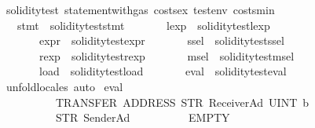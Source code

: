 \begin{isabellebody}
\isanewline
{}\isamarkupfalse%
\ soliditytest{}{\isacharcolon}{\kern0pt}\ statement{\isacharunderscore}{\kern0pt}with{\isacharunderscore}{\kern0pt}gas\ costs{\isacharunderscore}{\kern0pt}ex\ testenv{}\ costs{\isacharunderscore}{\kern0pt}min\isanewline
\ \ \ stmt{}\ {\isacharequal}{\kern0pt}\ {\isachardoublequoteopen}soliditytest{}{\isachardot}{\kern0pt}stmt{\isachardoublequoteclose}\isanewline
\ \ \ \ \ \ \ lexp{}\ {\isacharequal}{\kern0pt}\ soliditytest{}{\isachardot}{\kern0pt}lexp\ \isanewline
\ \ \ \ \ \ \ expr{}\ {\isacharequal}{\kern0pt}\ soliditytest{}{\isachardot}{\kern0pt}expr\isanewline
\ \ \ \ \ \ \ ssel{}\ {\isacharequal}{\kern0pt}\ soliditytest{}{\isachardot}{\kern0pt}ssel\isanewline
\ \ \ \ \ \ \ rexp{}\ {\isacharequal}{\kern0pt}\ soliditytest{}{\isachardot}{\kern0pt}rexp\isanewline
\ \ \ \ \ \ \ msel{}\ {\isacharequal}{\kern0pt}\ soliditytest{}{\isachardot}{\kern0pt}msel\isanewline
\ \ \ \ \ \ \ load{}\ {\isacharequal}{\kern0pt}\ soliditytest{}{\isachardot}{\kern0pt}load\isanewline
\ \ \ \ \ \ \ eval{}\ {\isacharequal}{\kern0pt}\ soliditytest{}{\isachardot}{\kern0pt}eval\isanewline
%
\isadelimproof
\ \ %
\endisadelimproof
%
\isatagproof
{}\isamarkupfalse%
\ unfold{\isacharunderscore}{\kern0pt}locales\ auto%
\endisatagproof
{\isafoldproof}%
%
\isadelimproof
\isanewline
%
\endisadelimproof
\isanewline
{}\isamarkupfalse%
\ {\isachardoublequoteopen}eval{}\ {}{}{}{}\isanewline
\ \ \ \ \ \ \ \ \ \ {\isacharparenleft}{\kern0pt}TRANSFER\ {\isacharparenleft}{\kern0pt}ADDRESS\ {\isacharparenleft}{\kern0pt}STR\ {\isacharprime}{\kern0pt}{\isacharprime}{\kern0pt}ReceiverAd{\isacharprime}{\kern0pt}{\isacharprime}{\kern0pt}{\isacharparenright}{\kern0pt}{\isacharparenright}{\kern0pt}\ {\isacharparenleft}{\kern0pt}UINT\ b{}{}{}\ {}{}{\isacharparenright}{\kern0pt}{\isacharparenright}{\kern0pt}\isanewline
\ \ \ \ \ \ \ \ \ \ {\isacharparenleft}{\kern0pt}STR\ {\isacharprime}{\kern0pt}{\isacharprime}{\kern0pt}SenderAd{\isacharprime}{\kern0pt}{\isacharprime}{\kern0pt}{\isacharparenright}{\kern0pt}\isanewline
\ \ \ \ \ \ \ \ \ \ EMPTY\isanewline

\end{isabellebody}
